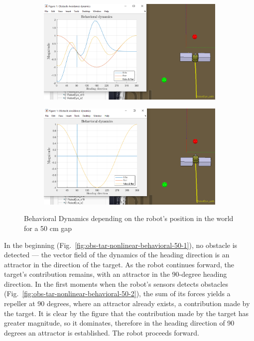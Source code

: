 \begin{figure}[htb!]
\begin{subfigure}{.45\textwidth}
  \caption{}%
  \label{fig:obs-tar-nonlinear-behavioral-50-3}
  \end{subfigure}
  \begin{subfigure}{.45\textwidth}
    \includegraphics[width=\textwidth]{img/3-3-4.PNG}%
  \caption{}%
  \label{fig:obs-tar-nonlinear-behavioral-50-4}
  \end{subfigure}
%
  \begin{subfigure}{.45\textwidth}
  \includegraphics[width=\textwidth]{img/3-3-5.PNG}%
  \caption{}%
  \label{fig:obs-tar-nonlinear-behavioral-50-5}
  \end{subfigure}
  \caption{Behavioral Dynamics depending on the robot's position in the world for a 50 cm gap}%
  \label{fig:obs-tar-nonlinear-behavioral-50}
\end{figure}

In the beginning (Fig.~\ref{fig:obs-tar-nonlinear-behavioral-50-1}), no obstacle
is detected --- the vector field of the dynamics of the heading direction is an attractor in the direction of the target.
As the robot continues forward, the target's contribution remains, with an
attractor in the 90-degree heading direction. In the first moments when the
robot's sensors detects obstacles (Fig.~\ref{fig:obs-tar-nonlinear-behavioral-50-2}), the sum
of its forces yields a repeller at 90 degrees, where an attractor already
exists, a contribution made by the target. It is clear by the figure that the
contribution made by the target has greater magnitude, so it dominates,
therefore in the heading direction of 90 degrees an attractor is
established. The robot proceeds forward.

